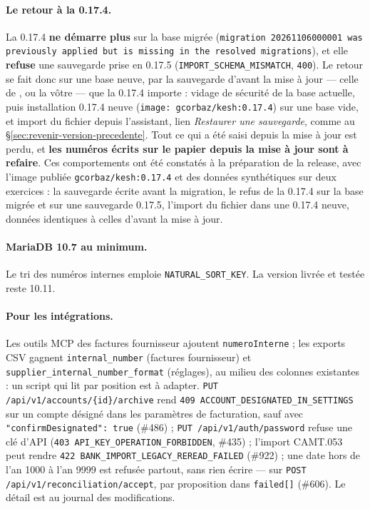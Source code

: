 \documentclass[a4paper,11pt,oneside]{article}
\begin{document}
\paragraph{Le retour à la 0.17.4.} La 0.17.4 \textbf{ne démarre plus} sur la base migrée (\texttt{migration 20261106000001 was previously applied but is missing in the resolved migrations}), et elle \textbf{refuse} une sauvegarde prise en 0.17.5 (\texttt{IMPORT\_SCHEMA\_MISMATCH}, \texttt{400}). Le retour se fait donc sur une base neuve, par la sauvegarde d'avant la mise à jour --- celle de , ou la vôtre --- que la 0.17.4 importe : vidage de sécurité de la base actuelle, puis installation 0.17.4 neuve (\texttt{image: gcorbaz/kesh:0.17.4}) sur une base vide, et import du fichier depuis l'assistant, lien \emph{Restaurer une sauvegarde}, comme au \S\ref{sec:revenir-version-precedente}. Tout ce qui a été saisi depuis la mise à jour est perdu, et \textbf{les numéros écrits sur le papier depuis la mise à jour sont à refaire}. Ces comportements ont été constatés à la préparation de la release, avec l'image publiée \texttt{gcorbaz/kesh:0.17.4} et des données synthétiques sur deux exercices : la sauvegarde  écrite avant la migration, le refus de la 0.17.4 sur la base migrée et sur une sauvegarde 0.17.5, l'import du fichier  dans une 0.17.4 neuve, données identiques à celles d'avant la mise à jour.

\paragraph{MariaDB 10.7 au minimum.} Le tri des numéros internes emploie \texttt{NATURAL\_SORT\_KEY}. La version livrée et testée reste 10.11.

\begin{sloppypar}
\paragraph{Pour les intégrations.} Les outils MCP des factures fournisseur ajoutent \texttt{numeroInterne} ; les exports CSV gagnent \texttt{internal\_number} (factures fournisseur) et \texttt{supplier\_internal\_number\_format} (réglages), au milieu des colonnes existantes : un script qui lit par position est à adapter. \texttt{PUT /api/v1/accounts/\{id\}/archive} rend \texttt{409 ACCOUNT\_DESIGNATED\_IN\_SETTINGS} sur un compte désigné dans les paramètres de facturation, sauf avec \texttt{"confirmDesignated": true} (\#486) ; \texttt{PUT /api/v1/auth/password} refuse une clé d'API (\texttt{403 API\_KEY\_OPERATION\_FORBIDDEN}, \#435) ; l'import CAMT.053 peut rendre \texttt{422 BANK\_IMPORT\_LEGACY\_REREAD\_FAILED} (\#922) ; une date hors de l'an 1000 à l'an 9999 est refusée partout, sans rien écrire --- sur \texttt{POST /api/v1/reconciliation/accept}, par proposition dans \texttt{failed[]} (\#606). Le détail est au journal des modifications.
\end{sloppypar}
\end{document}
